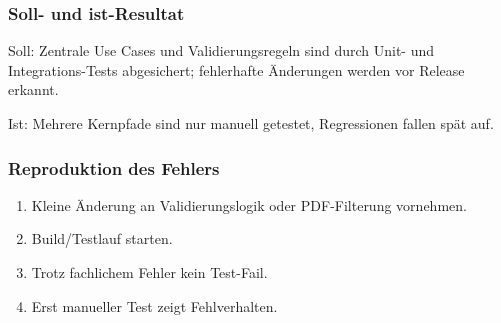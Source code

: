 \documentclass[a4paper]{article}
\begin{document}
\subsubsection*{Soll- und ist-Resultat}
Soll: Zentrale Use Cases und Validierungsregeln sind durch Unit- und Integrations-Tests abgesichert; fehlerhafte Änderungen werden vor Release erkannt. 

Ist: Mehrere Kernpfade sind nur manuell getestet, Regressionen fallen spät auf.

\subsubsection*{Reproduktion des Fehlers} 

\begin{enumerate}
    \item Kleine Änderung an Validierungslogik oder PDF-Filterung vornehmen.
    \item Build/Testlauf starten.
    \item Trotz fachlichem Fehler kein Test-Fail.
    \item Erst manueller Test zeigt Fehlverhalten.
\end{enumerate}
\end{document}
